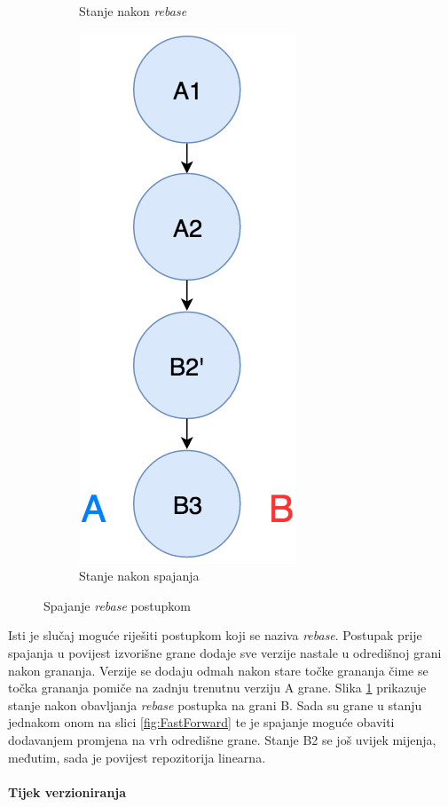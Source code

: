 \documentclass[times, utf8, diplomski, numeric]{fer}
\begin{document}
\begin{figure}[b!]
\begin{subfigure}{.3\textwidth}
\caption{Stanje nakon \textit{rebase}}
\label{fig:RebaseB}
\end{subfigure}
\begin{subfigure}{.3\textwidth}
\centering
\includegraphics[scale=0.5]{RebaseC}
\caption{Stanje nakon spajanja}
\label{fig:RebaseC}
\end{subfigure}
\caption{Spajanje \textit{rebase} postupkom}
\label{fig:Rebase}
\end{figure}

Isti je slučaj moguće riješiti postupkom koji se naziva \textit{rebase}. Postupak prije spajanja u povijest izvorišne grane dodaje sve verzije nastale u odredišnoj grani nakon grananja. Verzije se dodaju odmah nakon stare točke grananja čime se točka grananja pomiče na zadnju trenutnu verziju A grane. Slika \ref{fig:RebaseB} prikazuje stanje nakon obavljanja \textit{rebase} postupka na grani B. Sada su grane u stanju jednakom onom na slici \ref{fig:FastForward} te je spajanje moguće obaviti dodavanjem promjena na vrh odredišne grane. Stanje B2 se još uvijek mijenja, međutim, sada je povijest repozitorija linearna.

\paragraph{Tijek verzioniranja} \label{header:Implementacija_verzioniranja}
\end{document}
